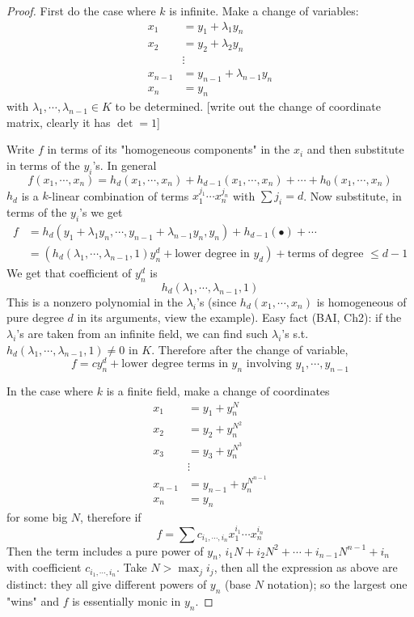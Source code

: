 \documentclass[11pt,a4paper]{article}
\theoremstyle{definition}
\theoremstyle{plain}
\theoremstyle{remark}
\begin{document}
\begin{proof}
    First do the case where $k$ is infinite. Make a change of variables: 
    \begin{align*}
        x_1 &= y_1 + \lambda_1 y_n \\
        x_2 &= y_2 + \lambda_2 y_n \\
        &\vdots \\
        x_{n-1} &= y_{n-1} +\lambda_{n-1} y_n \\
        x_n &= y_n
    \end{align*}
    with $\lambda_1, \cdots, \lambda_{n-1} \in K$ to be determined.
    [write out the change of coordinate matrix, clearly it has $\det = 1$]

    Write $f$ in terms of its "homogeneous components" in the $x_i$ and then substitute in terms of the $y_i$'s. 
    In general
    $$f(x_1, \cdots, x_n) = h_d(x_1, \cdots, x_n) + h_{d-1} (x_1, \cdots, x_n) + \cdots + h_0 (x_1, \cdots, x_n)$$
    $h_d$ is a $k$-linear combination of terms $x_1^{j_1} \cdots x_n^{j_n}$ with 
    $\sum j_i = d$. 
    Now substitute, in terms of the $y_i$'s we get 
    \begin{align*}
        f &= h_d(y_1 + \lambda_1 y_n, \cdots, y_{n-1} + \lambda_{n-1} y_n, y_n) + h_{d-1} (\bullet) + \cdots \\
        &=(h_d(\lambda_1,\cdots, \lambda_{n-1}, 1) y_n^d + \text{lower degree in $y_d$}) + \text{terms of degree $\le d-1$}
    \end{align*}
    We get that coefficient of $y_n^d$ is 
    $$h_d(\lambda_1, \cdots, \lambda_{n-1}, 1)$$
    This is a nonzero polynomial in the $\lambda_i$'s (since $h_d(x_1, \cdots, x_n)$ is homogeneous of pure degree $d$ in its arguments, 
    view the example). Easy fact (BAI, Ch2): if the $\lambda_i$'s are taken from an infinite field, we can find 
    such $\lambda_i$'s s.t. $h_d(\lambda_1, \cdots, \lambda_{n-1}, 1) \ne 0$ in $K$. 
    Therefore after the change of variable, 
    $$f = c y_n^d + \text{lower degree terms in } y_n \text{ involving $y_1, \cdots, y_{n-1}$}$$

    In the case where $k$ is a finite field, make a change of coordinates 
    \begin{align*}
        x_1 &= y_1 + y_n^N \\
        x_2 &= y_2 + y_n^{N^2} \\
        x_3 &= y_3 + y_n^{N^3} \\
        &\vdots \\
        x_{n-1} &= y_{n-1} + y_{n}^{N^{n-1}} \\
        x_n &= y_n
    \end{align*} 
    for some big $N$, therefore if 
    $$f = \sum c_{i_1, \cdots, i_n} x_1^{i_1} \cdots x_n^{i_n}$$
    Then the term includes a pure power of $y_n$, $i_1 N + i_2N^2 + \cdots + i_{n-1} N^{n-1} + i_n$ with coefficient 
    $c_{i_1, \cdots, i_n}$. Take $N > \max_j i_j$, then all the expression as above are distinct: 
    they all give different powers of $y_n$ (base $N$ notation); so the largest one "wins" and $f$ is essentially monic
    in $y_n$. 
\end{proof}
\end{document}
